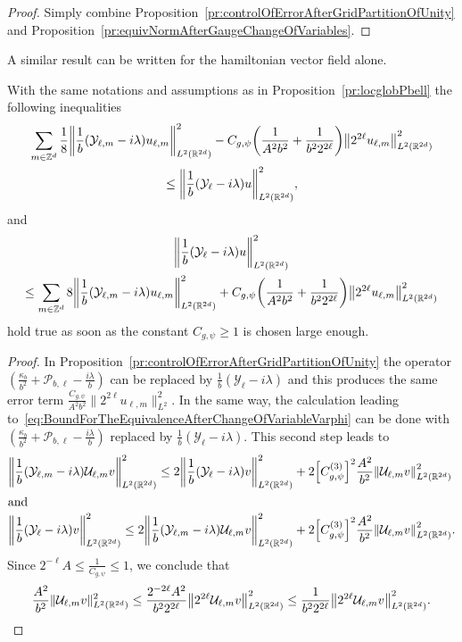 \documentclass[AHL,Unicode,longabstracts]{cedram}
\newcommand{\Z}{\mathbb{Z}}
\newcommand{\R}{\mathbb{R}}
\newcommand{\clY}{\mathcal{Y}}
\newcommand{\clP}{\mathcal{P}}
\newcommand{\clU}{\mathcal{U}}
\newcommand\norm[1]{\left\lVert#1\right\rVert}
\let\originalleft\left
\let\originalright\right
\renewcommand{\left}{\mathopen{}\mathclose\bgroup\originalleft}
\renewcommand{\right}{\aftergroup\egroup\originalright}
\newcounter{setofstep}
\newcounter{step}[setofstep]
\begin{document}
\begin{proof}
Simply combine Proposition~\ref{pr:controlOfErrorAfterGridPartitionOfUnity} and Proposition~\ref{pr:equivNormAfterGaugeChangeOfVariables}.
\end{proof}

A similar result can be written for the hamiltonian vector field alone.

\begin{prop}\label{pr:locglobYell}
With the same notations and assumptions as in Proposition~\ref{pr:locglobPbell} the following inequalities
\begin{multline*}
\sum_{m\in \Z^d}\frac{1}{8}\left\| \frac{1}{b}(\clY_{\ell,m} - i\lambda) u_{\ell,m}\right\|^{2}_{L^2(\R^{2d})}-C_{g,\psi}\left(\frac{1}{A^2b^2}+\frac{1}{b^2 2^{2\ell}}\right)\norm{2^{2\ell}u_{\ell,m}}_{L^2(\R^{2d})}^2
\\
\leq
\left\| \frac{1}{b}(\clY_{\ell} - i\lambda) u \right\|^{2}_{L^2(\R^{2d})},
\end{multline*}
and
\begin{multline*}
\left\| \frac{1}{b}(\clY_{\ell} - i\lambda) u \right\|^{2}_{L^2(\R^{2d})}
\\
\leq \sum_{m\in \Z^d} 8\left\| \frac{1}{b}(\clY_{\ell,m} - i\lambda) u_{\ell,m}\right\|^{2}_{L^2(\R^{2d})} +C_{g,\psi}\left(\frac{1}{A^2b^2}+\frac{1}{b^2 2^{2\ell}}\right)\norm{2^{2\ell}u_{\ell,m}}_{L^2(\R^{2d})}^2
\end{multline*}
hold true as soon as the constant $C_{g,\psi}\geq 1$ is chosen large enough.
\end{prop}
\begin{proof}
In Proposition~\ref{pr:controlOfErrorAfterGridPartitionOfUnity} the operator $(\frac{\kappa_{b}}{b^{2}}+\clP_{b,\ell} - \frac{i\lambda}{b})$ can be replaced by $\frac{1}{b}(\clY_{\ell}-i\lambda)$ and this produces the same error term $\frac{C_{g,\psi}}{A^2b^2}\|2^{2\ell}u_{\ell,m}\|_{L^2}^2$. In the same way, the calculation leading to~\eqref{eq:BoundForTheEquivalenceAfterChangeOfVariableVarphi} can be done with $(\frac{\kappa_{b}}{b^{2}}+\clP_{b,\ell} - \frac{i\lambda}{b})$ replaced by $\frac{1}{b}(\clY_{\ell}-i\lambda)$. This second step leads to
\begin{align*}
\left\|\frac{1}{b}(\clY_{\ell,m}-i\lambda)\clU_{\ell,m}v\right\|^2_{L^2(\R^{2d})}\leq 2\left\|\frac{1}{b}(\clY_{\ell}-i\lambda)v\right\|^2_{L^2(\R^{2d})} &+2\left[C_{g,\psi}^{(3)}\right]^2\frac{A^2}{b^2}\left\|\clU_{\ell,m}v\right\|^2_{L^2(\R^{2d})}
\\
\intertext{and}
\left\|\frac{1}{b}(\clY_{\ell}-i\lambda)v\right\|^2_{L^2(\R^{2d})}\leq 2 \left\|\frac{1}{b}(\clY_{\ell,m}-i\lambda)\clU_{\ell,m}v\right\|^2_{L^2(\R^{2d})} &+2\left[C_{g,\psi}^{(3)}\right]^2\frac{A^2}{b^2}\left\|\clU_{\ell,m}v\right\|^2_{L^2(\R^{2d})}.
\end{align*}
Since $2^{-\ell}A\leq \frac{1}{C_{g,\psi}}\leq 1 $, we conclude that
\[
\frac{A^2}{b^2}\|\clU_{\ell,m}v\|^2_{L^2(\R^{2d})}\leq \frac{2^{-2\ell}A^2}{b^2 2^{2\ell}}\left\|2^{2\ell}\clU_{\ell,m}v\right\|^2_{L^2(\R^{2d})}\leq\frac{1}{b^2 2^{2\ell}}\left\|2^{2\ell}\clU_{\ell,m}v\right\|^2_{L^2(\R^{2d})}.\qedhere
\]
\end{proof}
\end{document}

